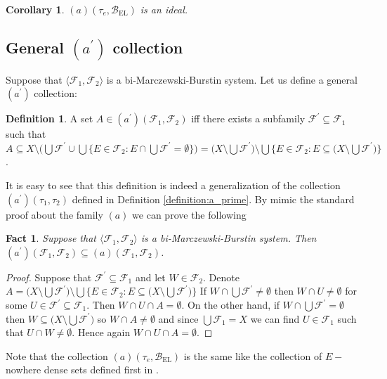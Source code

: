 \documentclass[12pt]{amsart}
\theoremstyle{plain}
\newtheorem{corollary}[theorem]{Corollary}
\newtheorem{fact}[theorem]{Fact}
\theoremstyle{definition}
\newtheorem{definition}[theorem]{Definition}
\theoremstyle{remark}
\newcommand{\cB}{{\mathcal B}}
\newcommand{\cF}{{\mathcal F}}
\newcommand{\aideal}{\mathit{(a)}}
\newcommand{\aidealprime}{\mathit{(a^\prime)}}
\newcommand{\biMB}{bi-Marczewski-Burstin}
\newcommand{\baseEllentuck}{\cB_{\mathrm{EL}}}
\begin{document}
\begin{corollary}
$\aideal(\tau_e, \baseEllentuck)$ is an ideal.
\end{corollary} 

\subsection{General $\aidealprime$ collection}

Suppose that $\langle \cF_1, \cF_2 \rangle$ is a \biMB{} system.
Let us define a general $\aidealprime$ collection:

\begin{definition}
A set $A \in \aidealprime(\cF_1, \cF_2)$ iff there exists
a subfamily $\cF^\prime \subseteq \cF_1$ such 
that $A \subseteq X \setminus \big( \bigcup \cF^\prime \cup 
\bigcup \lbrace E \in \cF_2 \colon E \cap \bigcup \cF^\prime = \emptyset \rbrace\big) = \big( X \setminus \bigcup \cF^\prime \big)
\setminus \bigcup \lbrace E \in \cF_2 \colon E \subseteq 
\big( X \setminus \bigcup \cF^\prime \big)\rbrace$.
\end{definition}

  It is easy to see that this definition is indeed a generalization
of the collection $\aidealprime(\tau_1, \tau_2)$ defined in 
Definition \ref{definition:a_prime}. 
By mimic the standard proof about the family $\aideal$
we can prove the following
\begin{fact}
Suppose that $\langle \cF_1, \cF_2 \rangle$ is a \biMB{} system.
Then $\aidealprime(\cF_1, \cF_2) \subseteq \aideal(\cF_1, \cF_2)$.
\end{fact}
\begin{proof}
Suppose that $\cF^\prime \subseteq \cF_1$
and let $W \in \cF_2$. 
Denote $A = \big( X \setminus \bigcup \cF^\prime \big)
\setminus \bigcup \lbrace E \in \cF_2 \colon E \subseteq 
\big( X \setminus \bigcup \cF^\prime \big)\rbrace$
If $W \cap \bigcup \cF^\prime \not= \emptyset$
then $W \cap U \not= \emptyset$ for some 
$U \in \cF^\prime \subseteq \cF_1$.
Then $W \cap U \cap A = \emptyset$.
On the other hand, if $W \cap \bigcup \cF^\prime = \emptyset$
then $W \subseteq \big( X \setminus \bigcup \cF^\prime \big)$
so $W \cap A \not= \emptyset$ and since 
$\bigcup \cF_1 = X$ we can find $U \in \cF_1$
such that $U \cap W \not= \emptyset$.
Hence again $W \cap U \cap A = \emptyset$.
\end{proof}


Note that the collection 
$\aideal(\tau_e, \baseEllentuck)$ is the same like the
collection of $E-$nowhere dense sets
defined first in \cite{Corazza1992}.
\end{document}
